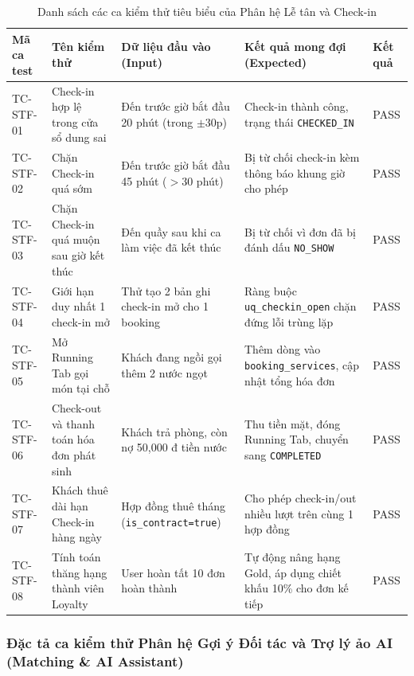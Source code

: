 \begin{table}[H]
\centering
\caption{Danh sách các ca kiểm thử tiêu biểu của Phân hệ Lễ tân và Check-in}
\label{tab:tc-staff}
\renewcommand{\arraystretch}{1.25}
\begin{tabular}{|p{2.2cm}|p{3.5cm}|p{3.5cm}|p{4.2cm}|p{1.2cm}|}
\hline
\textbf{Mã ca test} & \textbf{Tên kiểm thử} & \textbf{Dữ liệu đầu vào (Input)} & \textbf{Kết quả mong đợi (Expected)} & \textbf{Kết quả} \\
\hline
TC-STF-01 & Check-in hợp lệ trong cửa sổ dung sai & Đến trước giờ bắt đầu 20 phút (trong $\pm 30$p) & Check-in thành công, trạng thái \texttt{CHECKED\_IN} & PASS \\
\hline
TC-STF-02 & Chặn Check-in quá sớm & Đến trước giờ bắt đầu 45 phút ($> 30$ phút) & Bị từ chối check-in kèm thông báo khung giờ cho phép & PASS \\
\hline
TC-STF-03 & Chặn Check-in quá muộn sau giờ kết thúc & Đến quầy sau khi ca làm việc đã kết thúc & Bị từ chối vì đơn đã bị đánh dấu \texttt{NO\_SHOW} & PASS \\
\hline
TC-STF-04 & Giới hạn duy nhất 1 check-in mở & Thử tạo 2 bản ghi check-in mở cho 1 booking & Ràng buộc \texttt{uq\_checkin\_open} chặn đứng lỗi trùng lặp & PASS \\
\hline
TC-STF-05 & Mở Running Tab gọi món tại chỗ & Khách đang ngồi gọi thêm 2 nước ngọt & Thêm dòng vào \texttt{booking\_services}, cập nhật tổng hóa đơn & PASS \\
\hline
TC-STF-06 & Check-out và thanh toán hóa đơn phát sinh & Khách trả phòng, còn nợ 50,000 đ tiền nước & Thu tiền mặt, đóng Running Tab, chuyển sang \texttt{COMPLETED} & PASS \\
\hline
TC-STF-07 & Khách thuê dài hạn Check-in hàng ngày & Hợp đồng thuê tháng (\texttt{is\_contract=true}) & Cho phép check-in/out nhiều lượt trên cùng 1 hợp đồng & PASS \\
\hline
TC-STF-08 & Tính toán thăng hạng thành viên Loyalty & User hoàn tất 10 đơn hoàn thành & Tự động nâng hạng Gold, áp dụng chiết khấu 10\% cho đơn kế tiếp & PASS \\
\hline
\end{tabular}
\end{table}

\subsubsection{Đặc tả ca kiểm thử Phân hệ Gợi ý Đối tác và Trợ lý ảo AI (Matching \& AI Assistant)}

